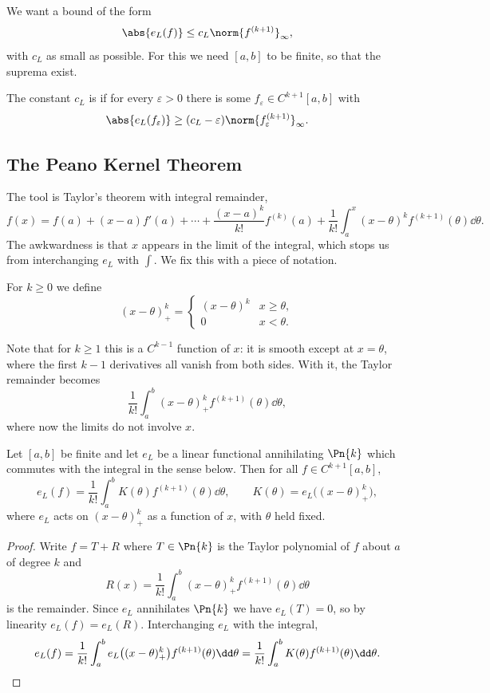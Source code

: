 We want a bound of the form
$$
\abs{e_L(f)} \leq c_L \norm{f^{(k+1)}}_\infty,
$$
with $c_L$ as small as possible. For this we need $[a,b]$ to be finite, so that the suprema exist.

\begin{definition}
  The constant $c_L$ is  if for every $\varepsilon > 0$ there is some $f_\varepsilon \in C^{k+1}[a,b]$ with
  $$
  \abs{e_L(f_\varepsilon)} \geq (c_L - \varepsilon)\norm{f_\varepsilon^{(k+1)}}_\infty .
  $$
\end{definition}

\subsection{The Peano Kernel Theorem}

The tool is Taylor's theorem with integral remainder,
$$
f(x) = f(a) + (x-a)f'(a) + \cdots + \frac{(x-a)^k}{k!}f^{(k)}(a) + \frac{1}{k!}\int_a^x (x-\theta)^k f^{(k+1)}(\theta)\dd\theta .
$$
The awkwardness is that $x$ appears in the limit of the integral, which stops us from interchanging $e_L$ with $\int$. We fix this with a piece of notation.

\begin{definition}
  For $k \geq 0$ we define
  $$
  (x - \theta)_+^k = \begin{cases} (x-\theta)^k & x \geq \theta,\\ 0 & x < \theta.\end{cases}
  $$
\end{definition}

Note that for $k \geq 1$ this is a $C^{k-1}$ function of $x$: it is smooth except at $x = \theta$, where the first $k-1$ derivatives all vanish from both sides. With it, the Taylor remainder becomes
$$
\frac{1}{k!}\int_a^b (x-\theta)_+^k f^{(k+1)}(\theta)\dd\theta,
$$
where now the limits do not involve $x$.

\begin{theorem}\label{thm:peano}
  Let $[a,b]$ be finite and let $e_L$ be a linear functional annihilating $\Pn{k}$ which commutes with the integral in the sense below. Then for all $f \in C^{k+1}[a,b]$,
  $$
  e_L(f) = \frac{1}{k!}\int_a^b K(\theta) f^{(k+1)}(\theta)\dd\theta, \qquad K(\theta) = e_L\big((x-\theta)_+^k\big),
  $$
  where $e_L$ acts on $(x-\theta)_+^k$ as a function of $x$, with $\theta$ held fixed.
\end{theorem}
\begin{proof}
  Write $f = T + R$ where $T \in \Pn{k}$ is the Taylor polynomial of $f$ about $a$ of degree $k$ and
  $$
  R(x) = \frac{1}{k!}\int_a^b (x-\theta)_+^k f^{(k+1)}(\theta)\dd\theta
  $$
  is the remainder. Since $e_L$ annihilates $\Pn{k}$ we have $e_L(T) = 0$, so by linearity $e_L(f) = e_L(R)$. Interchanging $e_L$ with the integral,
  $$
  e_L(f) = \frac{1}{k!}\int_a^b e_L\big((x-\theta)_+^k\big)f^{(k+1)}(\theta)\dd\theta = \frac{1}{k!}\int_a^b K(\theta)f^{(k+1)}(\theta)\dd\theta. \qedhere
  $$
\end{proof}


